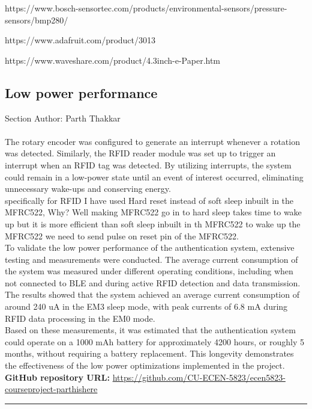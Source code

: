 \documentclass[a4paper,11pt]{article}%
\begin{document}
https://www.bosch-sensortec.com/products/environmental-sensors/pressure-sensors/bmp280/

https://www.adafruit.com/product/3013

https://www.waveshare.com/product/4.3inch-e-Paper.htm

\subsection{Low power performance}
Section Author: Parth Thakkar\\\\

The rotary encoder was configured to generate an interrupt whenever a rotation was detected. Similarly, the RFID reader module was set up to trigger an interrupt when an RFID tag was detected. By utilizing interrupts, the system could remain in a low-power state until an event of interest occurred, eliminating unnecessary wake-ups and conserving energy.\\

specifically for RFID I have used Hard reset instead of soft sleep inbuilt in the MFRC522, Why? Well making MFRC522 go in to hard sleep takes time to wake up but it is more efficient than soft sleep inbuilt in th MFRC522 to wake up the MFRC522 we need to send pulse on reset pin of the MFRC522.\\

To validate the low power performance of the authentication system, extensive testing and measurements were conducted. The average current consumption of the system was measured under different operating conditions, including when not connected to BLE and during active RFID detection and data transmission. The results showed that the system achieved an average current consumption of around 240 uA in the EM3 sleep mode, with peak currents of 6.8 mA during RFID data processing in the EM0 mode.\\

Based on these measurements, it was estimated that the authentication system could operate on a 1000 mAh battery for approximately 4200 hours, or roughly 5 months, without requiring a battery replacement. This longevity demonstrates the effectiveness of the low power optimizations implemented in the project.\\


\textbf{GitHub repository URL:} \href{https://github.com/CU-ECEN-5823/ecen5823-courseproject-parthishere}{https://github.com/CU-ECEN-5823/ecen5823-courseproject-parthishere}

\pagebreak


\hrule






\end{document}
